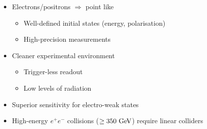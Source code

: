 \begin{frame}
\begin{columns}[t]

    \begin{itemize}
    \item Electrons/positrons $\Rightarrow$ point like
      \begin{itemize}
      \item Well-defined initial states (energy, polarisation)
      \item High-precision measurements
      \end{itemize}
    \item Cleaner experimental environment
      \begin{itemize}
      \item Trigger-less readout
      \item Low levels of radiation
      \end{itemize}
    \item Superior sensitivity for electro-weak states
    \item High-energy $e^+e^-$ collisions ($\geq350\,\mathrm{\,Ge\kern -0.1em V}$) require
      linear colliders
    \end{itemize}

  \end{columns}

\end{frame}


